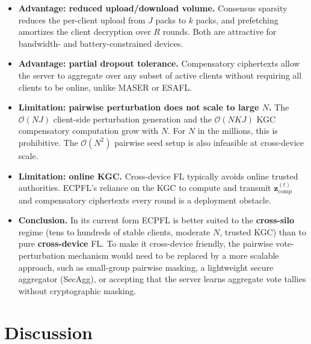 \documentclass[a4paper,11pt]{article}
\begin{document}
\begin{itemize}
    \item \textbf{Advantage: reduced upload/download volume.} Consensus sparsity reduces the per-client upload from $J$ packs to $k$ packs, and prefetching amortizes the client decryption over $R$ rounds. Both are attractive for bandwidth- and battery-constrained devices.
    \item \textbf{Advantage: partial dropout tolerance.} Compensatory ciphertexts allow the server to aggregate over any subset of active clients without requiring all clients to be online, unlike MASER or ESAFL.
    \item \textbf{Limitation: pairwise perturbation does not scale to large $N$.} The $\mathcal{O}(NJ)$ client-side perturbation generation and the $\mathcal{O}(NKJ)$ KGC compensatory computation grow with $N$. For $N$ in the millions, this is prohibitive. The $\mathcal{O}(N^2)$ pairwise seed setup is also infeasible at cross-device scale.
    \item \textbf{Limitation: online KGC.} Cross-device FL typically avoids online trusted authorities. ECPFL's reliance on the KGC to compute and transmit $\mathbf{z}_{\mathrm{comp}}^{(t)}$ and compensatory ciphertexts every round is a deployment obstacle.
    \item \textbf{Conclusion.} In its current form ECPFL is better suited to the \textbf{cross-silo} regime (tens to hundreds of stable clients, moderate $N$, trusted KGC) than to pure \textbf{cross-device} FL. To make it cross-device friendly, the pairwise vote-perturbation mechanism would need to be replaced by a more scalable approach, such as small-group pairwise masking, a lightweight secure aggregator (SecAgg), or accepting that the server learns aggregate vote tallies without cryptographic masking.
\end{itemize}

\section{Discussion}
\label{sec:discussion}
\end{document}
